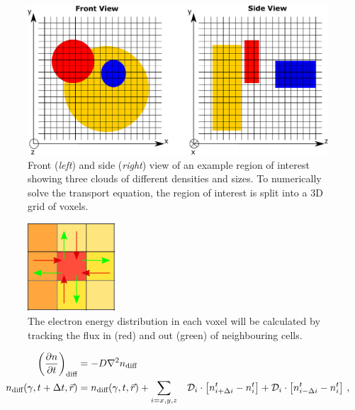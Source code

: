 \begin{figure}[h!]
	\centering
	\includegraphics[width=\textwidth]{09_Multizone/Images/code/cartesian.pdf}
	\caption{Front (\textit{left}) and side (\textit{right}) view of an example region of interest showing three clouds of different densities and sizes. To numerically solve the transport equation, the region of interest is split into a 3D grid of voxels.}
	\label{fig:chapter_8_multizone_cartesian}
\end{figure}
\begin{figure}
	\centering
	\includegraphics[width=0.29\textwidth]{09_Multizone/Images/code/transport.pdf}
	\caption{The electron energy distribution in each voxel will be calculated by tracking the flux in (red) and out (green) of neighbouring cells.}
	\label{eq:09_transport_cells}
\end{figure}
\begin{equation}
    \begin{aligned}
        \qty(\pdv{n}{t})_\text{diff}
        &= -D\nabla^2 n_\text{diff} \\
        n_\text{diff}\qty(\gamma,t+\Delta t,\vec{r})&=n_\text{diff}\qty(\gamma,t,\vec{r})+\sum_{i=x,y,z} &\mathcal{D}_i\cdot
        \qty[n_{i+\Delta i}^{t}
        -n_{i}^t]
        +\mathcal{D}_i\cdot
        \qty[n_{i-\Delta i}^t
        -n_i^t]\text{ ,}
    \end{aligned} \label{eq:chapter_8_multizone_diff_numerical_sol}
\end{equation}
